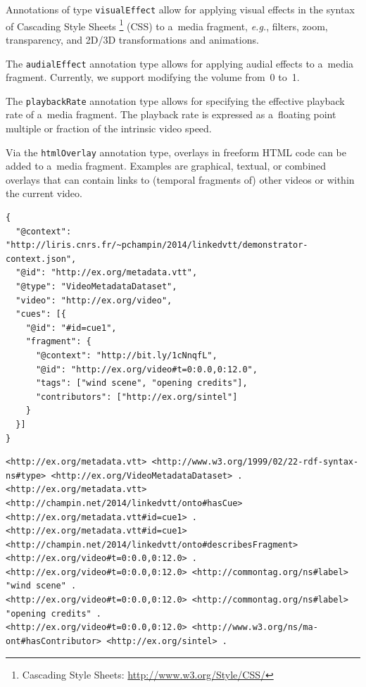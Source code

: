 \documentclass{sig-alternate}
\newcommand{\inlinelistingsize}{\fontsize{8pt}{11pt}}
\let\oldurl\url
\renewcommand{\url}[1]{\inlinelistingsize\oldurl{#1}}
\def\JSONLD{\mbox{JSON-LD}}
\begin{document}
\begin{description}[leftmargin=*]
  \item[Visual Effect] Annotations of
  type \texttt{visualEffect} allow for applying visual effects
  in the syntax of Cascading Style Sheets%
  \footnote{Cascading Style Sheets:
  \url{http://www.w3.org/Style/CSS/}} (CSS)
  to a~media fragment, \emph{e.g.},
  filters, zoom, transparency,
  and 2D/3D transformations and animations.

  \item[Audial Effect] The \texttt{audialEffect} annotation type
  allows for applying audial effects to a~media fragment.
  Currently, we support modifying the volume
  from~0 to~1.

  \item[Playback Rate] The \texttt{playbackRate}
  annotation type allows for specifying the effective
  playback rate of a~media fragment.
  The playback rate is expressed as a~floating point
  multiple or fraction of the intrinsic video speed.

  \item[HTML Overlay] Via the \texttt{htmlOverlay}
  annotation type, overlays in
  freeform HTML code can be added to a~media fragment.
  Examples are graphical, textual, or combined overlays
  that can contain links to (temporal fragments of)
  other videos or within the current video.
\end{description}

\begin{lstlisting}[caption={Generated \JSONLD\ file based on the WebVTT file 
    shown in \autoref{listing:webvtt}, see
    \autoref{listing:rdftriples} for the contained RDF triples},
  label=listing:jsonld, float=t!]
{
  "@context": "http://liris.cnrs.fr/~pchampin/2014/linkedvtt/demonstrator-context.json",
  "@id": "http://ex.org/metadata.vtt", 
  "@type": "VideoMetadataDataset",
  "video": "http://ex.org/video", 
  "cues": [{
    "@id": "#id=cue1",
    "fragment": {
      "@context": "http://bit.ly/1cNnqfL", 
      "@id": "http://ex.org/video#t=0:0.0,0:12.0", 
      "tags": ["wind scene", "opening credits"],
      "contributors": ["http://ex.org/sintel"]
    }
  }]
}
\end{lstlisting}

\begin{lstlisting}[caption={RDF triples based on the \JSONLD\ code from \autoref{listing:jsonld}},
  label=listing:rdftriples, float=t!]
<http://ex.org/metadata.vtt> <http://www.w3.org/1999/02/22-rdf-syntax-ns#type> <http://ex.org/VideoMetadataDataset> .
<http://ex.org/metadata.vtt> <http://champin.net/2014/linkedvtt/onto#hasCue> <http://ex.org/metadata.vtt#id=cue1> .
<http://ex.org/metadata.vtt#id=cue1> <http://champin.net/2014/linkedvtt/onto#describesFragment> <http://ex.org/video#t=0:0.0,0:12.0> .
<http://ex.org/video#t=0:0.0,0:12.0> <http://commontag.org/ns#label> "wind scene" .
<http://ex.org/video#t=0:0.0,0:12.0> <http://commontag.org/ns#label> "opening credits" .
<http://ex.org/video#t=0:0.0,0:12.0> <http://www.w3.org/ns/ma-ont#hasContributor> <http://ex.org/sintel> .
\end{lstlisting}
  
\end{document}
